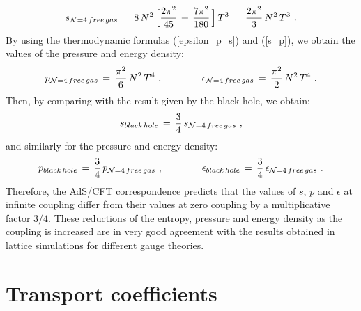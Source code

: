 \documentclass[12pt,notitlepage]{article}
\newcommand{\beq}{\begin{equation}}
\newcommand{\eeq}{\end{equation}}
\begin{document}
\beq
s_{{\cal N}=4\,free\, gas}\,=\,
8\,N^2\,\Big[{2\pi^2\over 45}\,+\,{7\pi^2\over 180}\,\Big]\,T^3\,=\,{2\pi^2\over 3}\,
N^2\,T^3\,\,.
\eeq
By using the thermodynamic formulas (\ref{epsilon_p_s}) and (\ref{s_p}), we obtain the values of the pressure and energy density:
\beq
p_{{\cal N}=4\,free\, gas}\,=\,{\pi^2\over 6}\,
N^2\,T^4\,\,,
\qquad\qquad
\epsilon_{{\cal N}=4\,free\, gas}\,=\,{\pi^2\over 2}\,
N^2\,T^4\,\,.
\eeq
Then, by comparing with the result given by the black hole, we obtain:
\beq
s_{black\, hole}\,=\,{3\over 4}\,s_{{\cal N}=4\,free\, gas}\,\,,
\label{sbh-sgass}
\eeq
and similarly for the pressure and energy density:
\beq
p_{black\, hole}\,=\,{3\over 4}\,p_{{\cal N}=4\,free\, gas}\,\,,
\qquad\qquad
\epsilon_{black\, hole}\,=\,{3\over 4}\,\epsilon_{{\cal N}=4\,free\, gas}\,\,.
\label{p-epsilon_bh-sgass}
\eeq
Therefore, the AdS/CFT correspondence predicts that the values of $s$, $p$ and $\epsilon$ at infinite coupling differ from their values at   zero coupling by a multiplicative  factor $3/4$. These reductions of the entropy, pressure and energy density as the coupling is increased are in very good agreement with the results obtained in lattice simulations for different gauge theories. 


\section{Transport coefficients}
\label{transport_coefficients}
\end{document}
